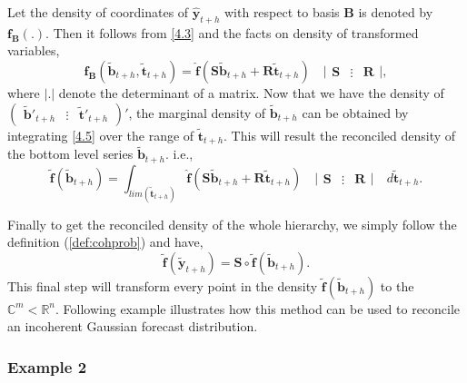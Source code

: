 \documentclass[a4paper, 11pt]{article}
\begin{document}
Let the density of coordinates of $\hat{\bm{y}}_{t+h}$ with respect to basis $\bm{B}$ is denoted by $\bm{f_B}(.)$. Then it follows from  \eqref{4.3} and the facts on density of transformed variables,
\begin{equation}\label{4.5}
\bm{f_B}(\tilde{\bm{b}}_{t+h},\tilde{\bm{t}}_{t+h})=\hat{\bm{f}}(\bm{S}\tilde{\bm{b}}_{t+h}+\bm{R}\tilde{\bm{t}}_{t+h}) \quad \Big|\begin{array}{ccc}\bm{S} & \vdots& \bm{R}\end{array}\Big|,
\end{equation}
where $|.|$ denote the determinant of a matrix. Now that we have the density of $\begin{pmatrix}\tilde{\bm{b}}'_{t+h} & \vdots& \tilde{\bm{t}}'_{t+h}\end{pmatrix}' $, the marginal density of $\tilde{\bm{b}}_{t+h}$ can be obtained by integrating \eqref{4.5} over the range of $\tilde{\bm{t}}_{t+h}$. This will result the reconciled density of the bottom level series $\tilde{\bm{b}}_{t+h}$. i.e.,
\begin{equation}\label{4.6}
\tilde{\bm{f}}(\tilde{\bm{b}}_{t+h})=\int_{lim(\tilde{\bm{t}}_{t+h})}\hat{\bm{f}}(\bm{S}\tilde{\bm{b}}_{t+h}+\bm{R}\tilde{\bm{t}}_{t+h}) \quad \Big|\begin{array}{ccc}\bm{S} & \vdots& \bm{R}\end{array}\Big| \quad d\tilde{\bm{t}}_{t+h}.
\end{equation}

Finally to get the reconciled density of the whole hierarchy, we simply follow the definition (\ref{def:cohprob}) and have,
\begin{equation}\label{4.7}
\tilde{\bm{f}}(\tilde{\bm{y}}_{t+h})=\bm{S}\circ \tilde{\bm{f}}(\tilde{\bm{b}}_{t+h}).
\end{equation}
This final step will transform every point in the density $\tilde{\bm{f}}(\tilde{\bm{b}}_{t+h})$ to the $\mathbb{C}^m<\mathbb{R}^n$. Following example illustrates how this method can be used to reconcile an incoherent Gaussian forecast distribution.

\subsubsection*{Example 2}
\end{document}
